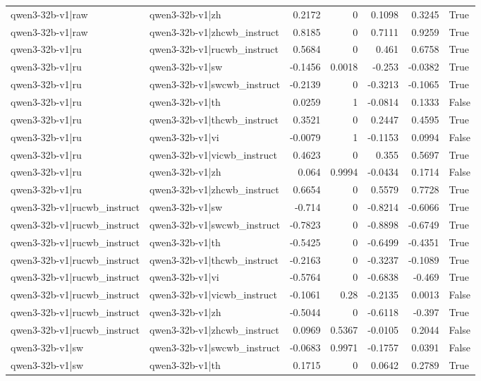 \begin{table}
\begin{tabular}{l l r r r r l}
qwen3-32b-v1|raw & qwen3-32b-v1|zh & 0.2172 & 0 & 0.1098 & 0.3245 & True \\
qwen3-32b-v1|raw & qwen3-32b-v1|zhcwb_instruct & 0.8185 & 0 & 0.7111 & 0.9259 & True \\
qwen3-32b-v1|ru & qwen3-32b-v1|rucwb_instruct & 0.5684 & 0 & 0.461 & 0.6758 & True \\
qwen3-32b-v1|ru & qwen3-32b-v1|sw & -0.1456 & 0.0018 & -0.253 & -0.0382 & True \\
qwen3-32b-v1|ru & qwen3-32b-v1|swcwb_instruct & -0.2139 & 0 & -0.3213 & -0.1065 & True \\
qwen3-32b-v1|ru & qwen3-32b-v1|th & 0.0259 & 1 & -0.0814 & 0.1333 & False \\
qwen3-32b-v1|ru & qwen3-32b-v1|thcwb_instruct & 0.3521 & 0 & 0.2447 & 0.4595 & True \\
qwen3-32b-v1|ru & qwen3-32b-v1|vi & -0.0079 & 1 & -0.1153 & 0.0994 & False \\
qwen3-32b-v1|ru & qwen3-32b-v1|vicwb_instruct & 0.4623 & 0 & 0.355 & 0.5697 & True \\
qwen3-32b-v1|ru & qwen3-32b-v1|zh & 0.064 & 0.9994 & -0.0434 & 0.1714 & False \\
qwen3-32b-v1|ru & qwen3-32b-v1|zhcwb_instruct & 0.6654 & 0 & 0.5579 & 0.7728 & True \\
qwen3-32b-v1|rucwb_instruct & qwen3-32b-v1|sw & -0.714 & 0 & -0.8214 & -0.6066 & True \\
qwen3-32b-v1|rucwb_instruct & qwen3-32b-v1|swcwb_instruct & -0.7823 & 0 & -0.8898 & -0.6749 & True \\
qwen3-32b-v1|rucwb_instruct & qwen3-32b-v1|th & -0.5425 & 0 & -0.6499 & -0.4351 & True \\
qwen3-32b-v1|rucwb_instruct & qwen3-32b-v1|thcwb_instruct & -0.2163 & 0 & -0.3237 & -0.1089 & True \\
qwen3-32b-v1|rucwb_instruct & qwen3-32b-v1|vi & -0.5764 & 0 & -0.6838 & -0.469 & True \\
qwen3-32b-v1|rucwb_instruct & qwen3-32b-v1|vicwb_instruct & -0.1061 & 0.28 & -0.2135 & 0.0013 & False \\
qwen3-32b-v1|rucwb_instruct & qwen3-32b-v1|zh & -0.5044 & 0 & -0.6118 & -0.397 & True \\
qwen3-32b-v1|rucwb_instruct & qwen3-32b-v1|zhcwb_instruct & 0.0969 & 0.5367 & -0.0105 & 0.2044 & False \\
qwen3-32b-v1|sw & qwen3-32b-v1|swcwb_instruct & -0.0683 & 0.9971 & -0.1757 & 0.0391 & False \\
qwen3-32b-v1|sw & qwen3-32b-v1|th & 0.1715 & 0 & 0.0642 & 0.2789 & True \\

\end{tabular}
\end{table}
